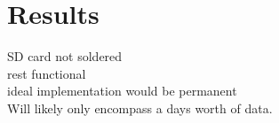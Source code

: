 \chapter{Results}


{\color{red} \huge SD card not soldered \\ rest functional \\ideal implementation would be permanent\\ Will likely only encompass a days worth of data.}